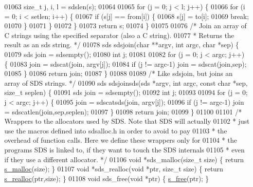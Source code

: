 \begin{DoxyCode}
{{{{{{{{{{{{{{{{01063     size\_t j, i, l = sdslen(s);
01064 
01065     \textcolor{keywordflow}{for} (j = 0; j < l; j++) \{
01066         \textcolor{keywordflow}{for} (i = 0; i < setlen; i++) \{
01067             \textcolor{keywordflow}{if} (s[j] == from[i]) \{
01068                 s[j] = to[i];
01069                 \textcolor{keywordflow}{break};
01070             \}
01071         \}
01072     \}
01073     \textcolor{keywordflow}{return} s;
01074 \}
01075 
01076 \textcolor{comment}{/* Join an array of C strings using the specified separator (also a C string).}
01077 \textcolor{comment}{ * Returns the result as an sds string. */}
01078 sds sdsjoin(\textcolor{keywordtype}{char} **argv, \textcolor{keywordtype}{int} argc, \textcolor{keywordtype}{char} *sep) \{
01079     sds join = sdsempty();
01080     \textcolor{keywordtype}{int} j;
01081 
01082     \textcolor{keywordflow}{for} (j = 0; j < argc; j++) \{
01083         join = sdscat(join, argv[j]);
01084         \textcolor{keywordflow}{if} (j != argc-1) join = sdscat(join,sep);
01085     \}
01086     \textcolor{keywordflow}{return} join;
01087 \}
01088 
01089 \textcolor{comment}{/* Like sdsjoin, but joins an array of SDS strings. */}
01090 sds sdsjoinsds(sds *argv, \textcolor{keywordtype}{int} argc, \textcolor{keyword}{const} \textcolor{keywordtype}{char} *sep, size\_t seplen) \{
01091     sds join = sdsempty();
01092     \textcolor{keywordtype}{int} j;
01093 
01094     \textcolor{keywordflow}{for} (j = 0; j < argc; j++) \{
01095         join = sdscatsds(join, argv[j]);
01096         \textcolor{keywordflow}{if} (j != argc-1) join = sdscatlen(join,sep,seplen);
01097     \}
01098     \textcolor{keywordflow}{return} join;
01099 \}
01100 
01101 \textcolor{comment}{/* Wrappers to the allocators used by SDS. Note that SDS will actually}
01102 \textcolor{comment}{ * just use the macros defined into sdsalloc.h in order to avoid to pay}
01103 \textcolor{comment}{ * the overhead of function calls. Here we define these wrappers only for}
01104 \textcolor{comment}{ * the programs SDS is linked to, if they want to touch the SDS internals}
01105 \textcolor{comment}{ * even if they use a different allocator. */}
01106 \textcolor{keywordtype}{void} *sds\_malloc(size\_t size) \{ \textcolor{keywordflow}{return} \hyperlink{sdsalloc_8h_a41e8c1188dca30db85c410c25fb417b6}{s\_malloc}(size); \}
01107 \textcolor{keywordtype}{void} *sds\_realloc(\textcolor{keywordtype}{void} *ptr, size\_t size) \{ \textcolor{keywordflow}{return} \hyperlink{sdsalloc_8h_a86d1b352c4e2c2848948649747bd296a}{s\_realloc}(ptr,size); \}
01108 \textcolor{keywordtype}{void} sds\_free(\textcolor{keywordtype}{void} *ptr) \{ \hyperlink{sdsalloc_8h_aa06cb49194c292098a753d87e2ac6b71}{s\_free}(ptr); \}
}}}}}}}}}}}}}}}}
\end{DoxyCode}
